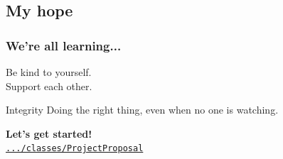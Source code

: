 \documentclass{beamer}
\begin{document}










\subsection{My hope}


\begin{frame}
    \frametitle{We're all learning...}

    \bigskip

    \begin{center}
        Be kind to yourself.\\
        Support each other.
    \end{center}

	\bigskip

    \begin{block}{Integrity}
      Doing the right thing, even when no one is watching.
    \end{block}

    \bigskip

    \begin{center}
    \textbf{Let's get started!}\\
        \texttt{\href{https://github.com/ScientificWriting/tree/master/classes/ProjectProposal}{.../classes/ProjectProposal}}
    \end{center}


\end{frame}
\end{document}

